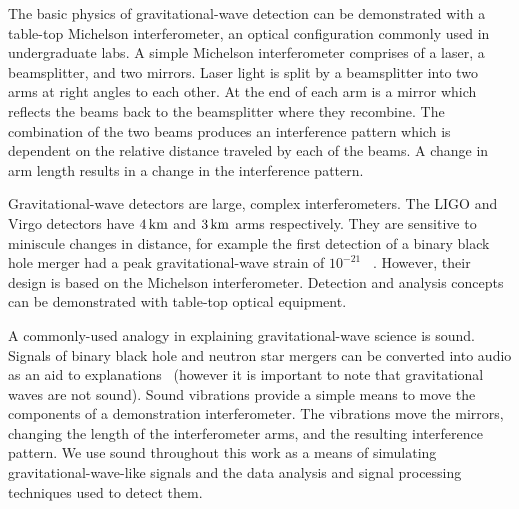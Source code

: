 \documentclass[paper-main.tex]{subfiles}
\begin{document}
The basic physics of gravitational-wave detection can be demonstrated with a table-top Michelson interferometer, an optical configuration commonly used in undergraduate labs. 
A simple Michelson interferometer comprises of a laser, a beamsplitter, and two mirrors. 
Laser light is split by a beamsplitter into two arms at right angles to each other. 
At the end of each arm is a mirror which reflects the beams back to the beamsplitter where they recombine. 
The combination of the two beams produces an interference pattern which is dependent on the relative distance traveled by each of the beams. 
A change in arm length results in a change in the interference pattern. 



Gravitational-wave detectors are large, complex interferometers.
The LIGO and Virgo detectors have $4\,{\rm km}$ and $3\,{\rm km}$ arms respectively.
They are sensitive to miniscule changes in distance, for example the first detection of a binary black hole merger had a peak gravitational-wave strain of $10^{-21}$ ~\cite{GW150914}.
However, their design is based on the Michelson interferometer. 
Detection and analysis concepts can be demonstrated with table-top optical equipment. 
 



A commonly-used analogy in explaining gravitational-wave science is sound. 
Signals of binary black hole and neutron star mergers can be converted into audio as an aid to explanations~\cite{SoundsOfSpaceTime:online,BlackHoleHunter:online} (however it is important to note that gravitational waves are not sound).  
Sound vibrations provide a simple means to move the components of a demonstration interferometer. 
The vibrations move the mirrors, changing the length of the interferometer arms, and the resulting interference pattern. 
We use sound throughout this work as a means of simulating gravitational-wave-like signals and the data analysis and signal processing techniques used to detect them.
\end{document}
